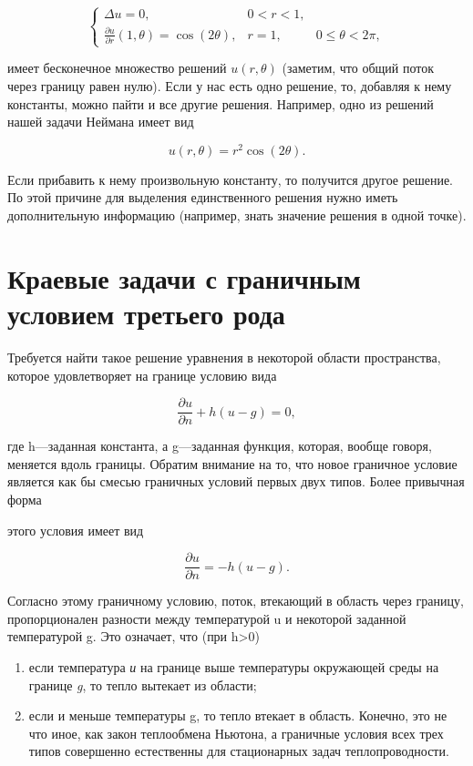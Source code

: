 \documentclass[
  ukrainian,
]{article}
\begin{document}
\[
\begin{cases} \Delta u = 0, & 0 < r < 1, \\ \frac{\partial u}{\partial r}(1, \theta) = \cos(2\theta), & r = 1, & 0 \le \theta < 2\pi, \end{cases}
\]

имеет бесконечное множество решений \(u(r,\theta)\) (заметим, что общий
поток через границу равен нулю). Если у нас есть одно решение, то,
добавляя к нему константы, можно пайти и все другие решения. Например,
одно из решений нашей задачи Неймана имеет вид

\[
u(r,\theta)=r^2\cos{(2\theta)}.
\]

Если прибавить к нему произвольную константу, то получится другое
решение. По этой причине для выделения единственного решения нужно иметь
дополнительную информацию (например, знать значение решения в одной
точке).

\section{\texorpdfstring{\textbf{Краевые задачи с граничным условием}
третьего
рода}{Краевые задачи с граничным условием третьего рода}}\label{ux43aux440ux430ux435ux432ux44bux435-ux437ux430ux434ux430ux447ux438-ux441-ux433ux440ux430ux43dux438ux447ux43dux44bux43c-ux443ux441ux43bux43eux432ux438ux435ux43c-ux442ux440ux435ux442ux44cux435ux433ux43e-ux440ux43eux434ux430}

Требуется найти такое решение уравнения в некоторой области
пространства, которое удовлетворяет на границе условию вида

\[
\frac{\partial u}{\partial n} + h (u - g) = 0,
\]

где h---заданная константа, а g---заданная функция, которая, вообще
говоря, меняется вдоль границы. Обратим внимание на то, что новое
граничное условие является как бы смесью граничных условий первых двух
типов. Более привычная форма

этого условия имеет вид

\[
\frac{\partial u}{\partial n} = -h (u - g).
\]

Согласно этому граничному условию, поток, втекающий в область через
границу, пропорционален разности между температурой u и некоторой
заданной температурой g. Это означает, что (при h\textgreater0)

\begin{enumerate}
\def\labelenumi{\arabic{enumi})}
\item
  если температура \emph{и} на границе выше температуры окружающей среды
  на границе \emph{g}, то тепло вытекает из области;
\item
  если и меньше температуры g, то тепло втекает в область. Конечно, это
  не что иное, как закон теплообмена Ньютона, а граничные условия всех
  трех типов совершенно естественны для стационарных задач
  теплопроводности.
\end{enumerate}
\end{document}
